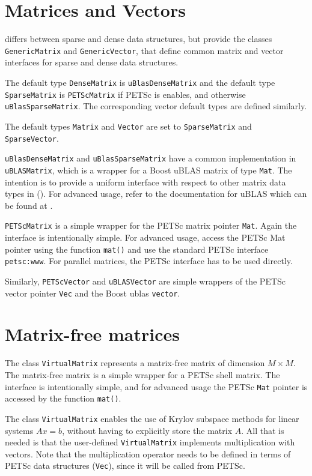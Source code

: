 \section{Matrices and Vectors}

\dolfin{} differs between sparse and dense data structures, but provide
the classes \texttt{GenericMatrix} and \texttt{GenericVector}, that define
common matrix and vector interfaces for sparse and dense data structures.

The default type \texttt{DenseMatrix} is \texttt{uBlasDenseMatrix} and
the default type \texttt{SparseMatrix} is \texttt{PETScMatrix} if
PETSc is enables, and otherwise \texttt{uBlasSparseMatrix}.
The corresponding vector default types are defined similarly.

The default types \texttt{Matrix} and \texttt{Vector} are set
to \texttt{SparseMatrix} and \texttt{SparseVector}.

\texttt{uBlasDenseMatrix} and \texttt{uBlasSparseMatrix} have
a common implementation in \texttt{uBLASMatrix}, which is a wrapper
for a Boost uBLAS matrix of type \texttt{Mat}.
The intention is to provide a uniform interface with respect to other
matrix data types in \dolfin().
For advanced usage, refer to the documentation for
uBLAS which can be found at \cite{www:ublas}.

\texttt{PETScMatrix} is a simple wrapper for the PETSc matrix
pointer \texttt{Mat}. Again the interface is intentionally simple.
For advanced usage, access the PETSc Mat pointer using the function
\texttt{mat()} and use the standard PETSc interface
\texttt{petsc:www}.
For parallel matrices, the PETSc interface has to be used directly.

Similarly, \texttt{PETScVector} and \texttt{uBLASVector} are
simple wrappers of the PETSc vector pointer \texttt{Vec} and
the Boost ublas \texttt{vector}.


\section{Matrix-free matrices}

The \dolfin{} class \texttt{VirtualMatrix} represents a matrix-free 
matrix of dimension $M\times M$. 
The matrix-free matrix is a simple wrapper for a PETSc shell matrix. 
The interface is intentionally simple, and for advanced usage the 
PETSc \texttt{Mat} pointer is accessed by the function \texttt{mat()}.  

The class \texttt{VirtualMatrix} enables the use of Krylov subspace
methods for linear systems $Ax = b$, without having to explicitly
store the matrix $A$. All that is needed is that the user-defined
\texttt{VirtualMatrix} implements multiplication with vectors. 
Note that the multiplication operator needs to be defined in terms of
PETSc data structures (\texttt{Vec}), since it will be called from PETSc.

